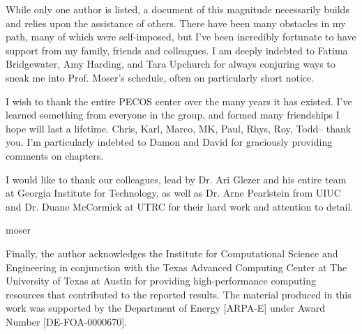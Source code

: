 %

While only one author is listed, a document of this magnitude
necessarily builds and relies upon the assistance of others. There have
been many obstacles in my path, many of which were self-imposed, but
I've been incredibly fortunate to have support from my family, friends
and colleagues. 
%
%
I am deeply indebted to Fatima Bridgewater, Amy Harding, and Tara
Upchurch for always conjuring ways to sneak me into Prof. Moser's
schedule, often on particularly short notice. 

%
%
I wish to thank the entire PECOS center over the many years it has
existed. I've learned something from everyone in the group, and formed
many friendships I hope will last a lifetime. Chris, Karl, Marco, MK,
Paul, Rhys, Roy, Todd-- thank you. I'm particularly indebted to Damon and
David for graciously providing comments on chapters.   

%
%
I would like to thank our colleagues, lead by Dr\@. Ari Glezer and his 
entire team at Georgia Institute for Technology, as well as Dr\@. Arne
Pearlstein from UIUC and Dr\@. Duane McCormick at UTRC for their hard
work and attention to detail. 

%
%
moser


%
%
%


Finally, the author acknowledges the Institute for Computational Science
and Engineering in conjunction with the Texas Advanced Computing Center
at The University of Texas at Austin for providing high-performance
computing resources that contributed to the reported results.
The material produced in this work was supported by the Department of
Energy [ARPA-E] under Award Number [DE-FOA-0000670].


